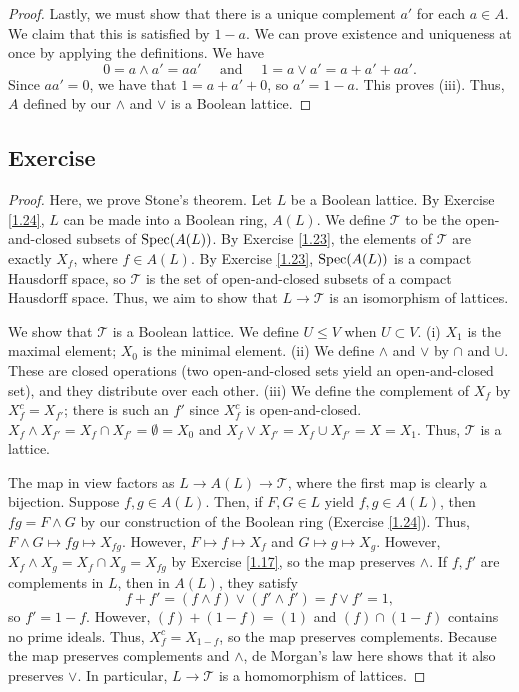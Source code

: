\begin{proof}
Lastly, we must show that there is a unique complement $a'$ for each $a \in A$. We claim that this is satisfied by $1 - a$. We can prove existence and uniqueness at once by
applying the definitions. We have
$$0 = a \wedge a' = a a' \quad\text{ and }\quad 1 = a \vee a' = a + a' + a a'.$$
Since $a a' = 0$, we have that $1 = a + a' + 0$, so $a' = 1 - a$. This proves (iii). Thus, $A$ defined by our $\wedge$ and $\vee$ is a Boolean lattice.
\end{proof}

\subsection{Exercise}\label{1.25}

\begin{proof}
Here, we prove Stone's theorem. Let $L$ be a Boolean lattice. By Exercise \ref{1.24}, $L$ can be made into a Boolean ring, $A(L)$. We define $\mathcal{T}$ to be the open-and-closed subsets of $\operatorname{Spec}(A(L))$. 
By Exercise \ref{1.23}, the elements of $\mathcal{T}$ are exactly $X_f$, where $f \in A(L)$. By Exercise \ref{1.23}, $\operatorname{Spec}(A(L))$ is a compact Hausdorff space, so $\mathcal{T}$ is the set of open-and-closed subsets
of a compact Hausdorff space. Thus, we aim to show that $L \to \mathcal{T}$ is an isomorphism of lattices.

We show that $\mathcal{T}$ is a Boolean lattice. We define $U \le V$ when $U \subset V$. (i) $X_1$ is the maximal element; $X_0$ is the minimal element. (ii) We define $\wedge$ and $\vee$ by $\cap$ 
and $\cup$. These are closed operations (two open-and-closed sets yield an open-and-closed set), and they distribute over each other. (iii) We define the complement of $X_f$ by $X_f^c = X_{f'}$; 
there is such an $f'$ since $X_f^c$ is open-and-closed. $X_f \wedge X_{f'} = X_f \cap X_{f'} = \emptyset = X_0$ and $X_f \vee X_{f'} = X_f \cup X_{f'} = X = X_1$. Thus, $\mathcal{T}$ is a lattice.

The map in view factors as $L \to A(L) \to \mathcal{T}$, where the first map is clearly a bijection. Suppose $f,g \in A(L)$. Then, if $F,G \in L$ yield $f,g \in A(L)$, then $fg = F \wedge G$ by
our construction of the Boolean ring (Exercise \ref{1.24}). Thus, $F \wedge G \mapsto fg \mapsto X_{fg}$. However, $F \mapsto f \mapsto X_f$ and $G \mapsto g \mapsto X_g$. However, $X_f \wedge X_g = X_f \cap X_g = X_{fg}$
by Exercise \ref{1.17}, so the map preserves $\wedge$. If $f, f'$ are complements in $L$, then in $A(L)$, they satisfy 
$$f + f' = (f \wedge f) \vee (f' \wedge f') = f \vee f' = 1,$$
so $f' = 1-f$. However, $(f) + (1-f) = (1)$ and $(f) \cap (1-f)$ contains no prime ideals. Thus, $X_f^c = X_{1-f}$, so the map preserves complements. Because the map preserves complements and $\wedge$,
de Morgan's law here shows that it also preserves $\vee$. In particular, $L \to \mathcal{T}$ is a homomorphism of lattices.


\end{proof}
